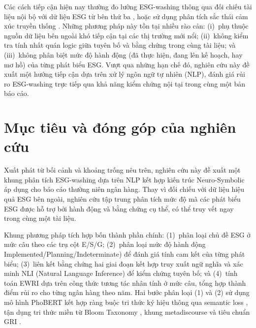 Các cách tiếp cận hiện nay thường đo lường ESG-washing thông qua đối chiếu tài liệu nội bộ với dữ liệu ESG từ bên thứ ba \cite{su16062571, kathan2025you}, hoặc sử dụng phân tích sắc thái cảm xúc truyền thống \cite{lagasio2024esg}. Những phương pháp này tồn tại nhiều rào cản: (i)~phụ thuộc nguồn dữ liệu bên ngoài khó tiếp cận tại các thị trường mới nổi; (ii)~không kiểm tra tính nhất quán logic giữa tuyên bố và bằng chứng trong cùng tài liệu; và (iii)~không phân biệt mức độ hành động (đã thực hiện, đang lên kế hoạch, hay mơ hồ) của từng phát biểu ESG. Vượt qua những hạn chế đó, nghiên cứu này đề xuất một hướng tiếp cận dựa trên xử lý ngôn ngữ tự nhiên (NLP), đánh giá rủi ro ESG-washing trực tiếp qua khả năng kiểm chứng nội tại trong cùng một bản báo cáo.


\section{Mục tiêu và đóng góp của nghiên cứu}
Xuất phát từ bối cảnh và khoảng trống nêu trên, nghiên cứu này đề xuất một khung phân tích ESG-washing dựa trên NLP kết hợp kiến trúc Neuro-Symbolic \cite{kautz2022third} áp dụng cho báo cáo thường niên ngân hàng. Thay vì đối chiếu với dữ liệu hiệu quả ESG bên ngoài, nghiên cứu tập trung phân tích mức độ mà các phát biểu ESG được hỗ trợ bởi hành động và bằng chứng cụ thể, có thể truy vết ngay trong cùng một tài liệu.

Khung phương pháp tích hợp bốn thành phần chính: (1)~phân loại chủ đề ESG ở mức câu theo các trụ cột E/S/G; (2)~phân loại mức độ hành động Implemented/Planning/Indeterminate) để đánh giá tính cam kết của từng phát biểu; (3)~liên kết bằng chứng hai giai đoạn kết hợp truy xuất ngữ nghĩa và xác minh NLI (Natural Language Inference) để kiểm chứng tuyên bố; và (4)~tính toán EWRI dựa trên công thức tương tác nhân tính ở mức câu, tổng hợp thành điểm rủi ro cho từng ngân hàng theo năm. Hai bước phân loại (1) và (2) sử dụng mô hình PhoBERT kết hợp ràng buộc tri thức ký hiệu thông qua semantic loss \cite{xu2018semantic}, tận dụng tri thức miền từ Bloom Taxonomy \cite{anderson2001taxonomy}, khung metadiscourse \cite{rodina2007metadiscourse} và tiêu chuẩn GRI \cite{gri2021gri}.


